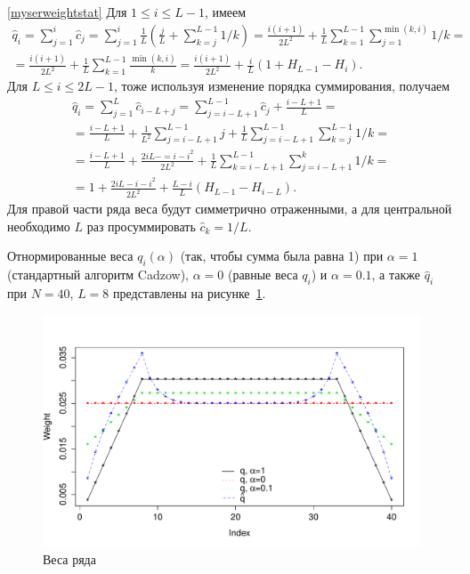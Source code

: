 \documentclass[12pt,a4paper,fleqn,leqno]{article}
\begin{document}
\begin{proof5}{\ref{myserweightstat}}
Для $1 \le i \le L-1$, имеем
\begin{gather*}
\hat{q}_i = \sum_{j=1}^i \hat{c}_j = \sum_{j=1}^i \frac{1}{L}\left(\frac{j}{L} + \sum_{k=j}^{L-1}1/k\right)\! =
\frac{i(i+1)}{2L^2}+\frac{1}{L} \sum_{k = 1}^{L-1} \sum_{j=1}^{\min(k,i)} 1/k =\\= \frac{i(i+1)}{2L^2}+\frac{1}{L} \sum_{k = 1}^{L-1} \frac{\min(k,i)}{k} = \frac{i(i+1)}{2 L^2} + \frac{i}{L}(1 + H_{L-1} - H_i).
\end{gather*}
Для $L \le i \le 2L-1$, тоже используя изменение порядка суммирования, получаем
\begin{gather*}
\hat{q}_i = \sum_{j = 1}^L \hat{c}_{i-L+j} = \sum_{j = i - L + 1}^{L - 1} \hat{c}_j + \frac{i - L + 1}{L} =\\
=\frac{i - L + 1}{L} + \frac{1}{L^2} \sum_{j = i - L + 1}^{L-1}j + \frac{1}{L} \sum_{j = i-L + 1}^{L-1} \sum_{k=j}^{L-1}1/k =\\
=\frac{i - L + 1}{L} + \frac{2iL - =i - i^2}{2L^2} + \frac{1}{L} \sum_{k = i - L + 1}^{L - 1} \sum_{j = i - L + 1}^k 1/k =\\
=1 + \frac{2iL-i-i^2}{2L^2} + \frac{L-i}{L}(H_{L-1} - H_{i - L}).
\end{gather*}
Для правой части ряда веса будут симметрично отраженными, а для центральной необходимо $L$ раз просуммировать $\hat{c}_k = 1/L$.
\end{proof5}

Отнормированные веса $q_i(\alpha)$ (так, чтобы сумма была равна 1) при $\alpha = 1$ (стандартный алгоритм Cadzow), $\alpha = 0$ (равные веса $q_i$) и $\alpha = 0.1$,
 а также $\hat{q}_i$ при $N = 40$, $L = 8$ представлены на рисунке~\ref{img_weights}.
\begin{figure}[!h] \begin{center}
\includegraphics[width = \textwidth]{weights.pdf}\caption{Веса ряда}\label{img_weights}
\end{center}\end{figure}
\end{document}
